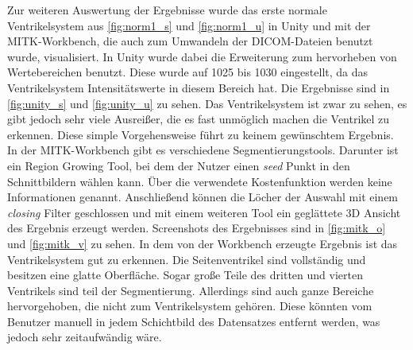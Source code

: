 Zur weiteren Auswertung der Ergebnisse wurde das erste normale Ventrikelsystem aus \autoref{fig:norm1_s} und \autoref{fig:norm1_u} in Unity und mit der MITK-Workbench, die auch zum Umwandeln der DICOM-Dateien benutzt wurde, visualisiert.
\newline
In Unity wurde dabei die Erweiterung zum hervorheben von Wertebereichen benutzt. Diese wurde auf 1025 bis 1030 eingestellt, da das Ventrikelsystem Intensitätswerte in diesem Bereich hat. Die Ergebnisse sind in \autoref{fig:unity_s} und \autoref{fig:unity_u} zu sehen.
\newline
Das Ventrikelsystem ist zwar zu sehen, es gibt jedoch sehr viele Ausreißer, die es fast unmöglich machen die Ventrikel zu erkennen. Diese simple Vorgehensweise führt zu keinem gewünschtem Ergebnis.
\newline
In der MITK-Workbench gibt es verschiedene Segmentierungstools. Darunter ist ein Region Growing Tool, bei dem der Nutzer einen \textit{seed} Punkt in den Schnittbildern wählen kann. Über die verwendete Kostenfunktion werden keine Informationen genannt. Anschließend können die Löcher der Auswahl mit einem \textit{closing} Filter geschlossen und mit einem weiteren Tool ein geglättete 3D Ansicht des Ergebnis erzeugt werden. Screenshots des Ergebnisses sind in \autoref{fig:mitk_o} und \autoref{fig:mitk_v} zu sehen.
\newline
In dem von der Workbench erzeugte Ergebnis ist das Ventrikelsystem gut zu erkennen. Die Seitenventrikel sind vollständig und besitzen eine glatte Oberfläche. Sogar große Teile des dritten und vierten Ventrikels sind teil der Segmentierung. Allerdings sind auch ganze Bereiche hervorgehoben, die nicht zum Ventrikelsystem gehören. Diese könnten vom Benutzer manuell in jedem Schichtbild des Datensatzes entfernt werden, was jedoch sehr zeitaufwändig wäre.


